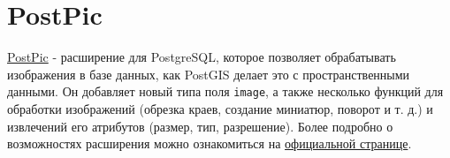 \section{PostPic}

\href{http://drotiro.github.io/postpic/}{PostPic} - расширение для PostgreSQL, которое позволяет обрабатывать изображения в базе данных, как PostGIS делает это с пространственными данными. Он добавляет новый типа поля \lstinline!image!, а также несколько функций для обработки изображений (обрезка краев, создание миниатюр, поворот и т. д.) и извлечений его атрибутов (размер, тип, разрешение). Более подробно о возможностях расширения можно ознакомиться на \href{https://github.com/drotiro/postpic/wiki/SQL-Functions-Guide}{официальной странице}.
